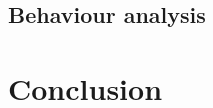 \documentclass[12pt,a4paper]{article}
\begin{document}
\subsection{Behaviour analysis}


\section*{Conclusion}




\end{document}
